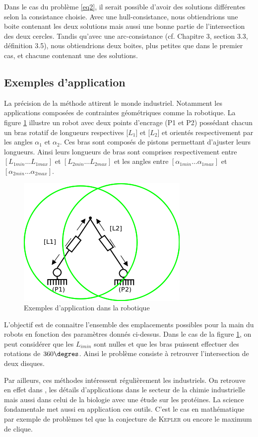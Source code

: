 Dans le cas du problème \ref{eq2}, il serait possible d'avoir des solutions différentes selon la consistance choisie. Avec une hull-consistance, nous obtiendrions une boite contenant les deux solutions mais aussi une bonne partie de l'intersection des deux cercles. Tandis qu'avec une arc-consistance (cf. \cite{Goualard} Chapitre 3, section 3.3, définition 3.5), nous obtiendrions deux boites, plus petites que dans le premier cas, et chacune contenant une des solutions.


\subsection{Exemples d'application}

La précision de la méthode attirent le monde industriel. Notamment les applications composées de contraintes géométriques comme la robotique. La figure \ref{fig:rob} illustre un robot avec deux points d'encrage (P1 et P2) possédant chacun un bras rotatif de longueurs respectives [$L_1$] et [$L_2$] et orientés respectivement par les angles $\alpha_1$ et $\alpha_2$. Ces bras sont composés de pistons permettant d'ajuster leurs longueurs. Ainsi leurs longueurs de bras sont comprises respectivement entre $[L_{1min} \dots L_{1max}]$ et $[L_{2min} \dots L_{2max}]$ et les angles entre $[\alpha_{1min} \dots \alpha_{1max}]$ et $[\alpha_{2min} \dots \alpha_{2max}]$.  

\begin{figure}[h] %
  \center
\includegraphics[scale=0.80]{img/robot2}
  \caption{Exemples d'application dans la robotique} %
 \label{fig:rob} %
\end{figure} %
L'objectif est de connaitre l'ensemble des emplacements possibles pour la main du robots en fonction des paramètres donnés ci-dessus. Dans le cas de la figure \ref{fig:rob}, on peut considérer que les $L_{imin}$ sont nulles et que les bras puissent effectuer des rotations de $360 \degres$. Ainsi le problème consiste à retrouver l'intersection de deux disques. 

  Par ailleurs, ces méthodes intéressent régulièrement les industriels. On retrouve en effet dans \cite{Schichl}, les détails d'applications dans le secteur de la chimie industrielle mais aussi dans celui de la biologie avec une étude sur les protéines. La science fondamentale met aussi en application ces outils. C'est le cas en mathématique par exemple de problèmes tel que la conjecture de \textsc{Kepler} ou encore le  maximum de clique.

\clearpage

